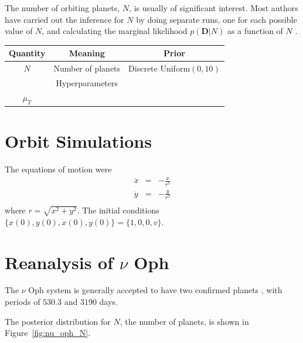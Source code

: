 \documentclass[useAMS,usenatbib]{mn2e}
\begin{document}
The number of orbiting planets, $N$, is usually of significant interest.
Most authors have carried out the inference for $N$ by doing separate runs, one
for each possible value of $N$, and calculating the marginal likelihood
$p(\boldsymbol{D} | N)$ as a function of $N$
\citep[e.g.][]{2011MNRAS.415.2523G, 2014MNRAS.437.3540F, fengji}.

\begin{table}
\begin{tabular}{|c|c|c|}
\hline
Quantity	&	Meaning		& Prior\\
\hline
$N$		& Number of planets	& Discrete Uniform$(0, 10)$\\
\hline
		&	Hyperparameters	&	\\
$\mu_T$		&			&	\\
\end{tabular}
\end{table}

\section{Orbit Simulations}

The equations of motion were
\begin{eqnarray}
\ddot{x} &=& -\frac{x}{r^3} \\
\ddot{y} &=& -\frac{y}{r^3} \\
\end{eqnarray}
where $r = \sqrt{x^2 + y^2}$. The initial conditions
$\{x(0), y(0), \dot{x}(0), \dot{y}(0)\} = \{1, 0, 0, v\}$.

\section{Reanalysis of $\nu$ Oph}
The $\nu$ Oph system is generally accepted to have two confirmed planets
\citep[e.g.][]{2011AIPC.1331..102Q, 2012PASJ...64..135S, fengji}, with periods
of $530.3$ and $3190$ days.

The posterior distribution for $N$, the number of planets, is shown in
Figure~\ref{fig:nu_oph_N}.
\end{document}
